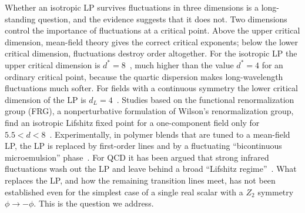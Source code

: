 \documentclass[aps,prd,twocolumn,superscriptaddress,nofootinbib,10pt]{revtex4-2}
\begin{document}
Whether an isotropic LP survives fluctuations in three dimensions is a
long-standing question, and the evidence suggests that it does not.  Two
dimensions control the importance of fluctuations at a critical point.  Above
the upper critical dimension, mean-field theory gives the correct critical
exponents; below the lower critical dimension, fluctuations destroy order
altogether.  For the isotropic LP the upper critical dimension is
$d^*=8$~\cite{Diehl2002,Diehl2002b}, much higher than the value $d^*=4$ for an
ordinary critical point, because the quartic dispersion makes long-wavelength
fluctuations much softer.  For fields with a continuous symmetry the lower
critical dimension of the LP is $d_L=4$~\cite{Diehl2002,Zappala2018}.
Studies based on the functional renormalization group (FRG), a
nonperturbative formulation of Wilson's renormalization group, find an
isotropic Lifshitz fixed point for a one-component field only for
$5.5<d<8$~\cite{Bonanno2015}.  Experimentally, in polymer blends that are
tuned to a mean-field LP, the LP is replaced by first-order lines and by a
fluctuating ``bicontinuous microemulsion'' phase~\cite{Bates1997,
Kielhorn1997,Duchs2003}.  For QCD it has been argued that strong infrared
fluctuations wash out the LP and leave behind a broad ``Lifshitz
regime''~\cite{Pisarski2019,Pisarski2019b,Pisarski2021b}.  What replaces the
LP, and how the remaining transition lines meet, has not been established even
for the simplest case of a single real scalar with a $Z_2$ symmetry
$\phi\to-\phi$.  This is the question we address.
\end{document}
